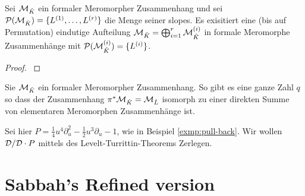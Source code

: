 \begin{thm}
\cite[Thm 5.3.1]{sabbah_cimpa90}
Sei $\mathcal{M}_{\hat{K}}$ ein formaler Meromorpher Zusammenhang und sei
$\mathcal{P}(\mathcal{M}_{\hat K})=\{L^{(1)},\dots,L^{(r)}\}$ die Menge seiner slopes. Es
exisitiert eine (bis auf Permutation) eindutige Aufteilung $\mathcal{M}_{\hat
K}=\bigoplus_{i=1}^r\mathcal{M}_{\hat K}^{(i)}$ in formale Meromorphe Zusammenhänge
mit $\mathcal{P}(\mathcal{M}_{\hat K}^{(i)})=\{L^{(i)}\}$.
\end{thm}
\begin{proof}
\cite[Thm 5.3.1]{sabbah_cimpa90}
\end{proof}
\begin{comment}
Aussagen, die aus dem Beweis entstehen:\\
Wir erhalten die Exacte Sequenz
\[
0 \rightarrow \cD_{\hat K}/\cD_{\hat K} \cdot P_1
  \rightarrow \cD_{\hat K}/\cD_{\hat K} \cdot P
  \rightarrow \cD_{\hat K}/\cD_{\hat K} \cdot P_2
  \rightarrow 0
\]
\begin{cor}
\cite[Thm 5.3.4]{sabbah_cimpa90}
$\cP(P)=\cP(P_1)\cup\cP(P_2)$ und $\cP(P_1)\cap\cP(P_2)=\emptyset$
\end{cor}
\end{comment}
\begin{comment}
\cite[Page 34]{sabbah_cimpa90}
Sei $\cM_{\hat K}$ ein formaler Meromorpher Zusammenhang. Man definiert
$\pi^*\cM_{\hat K}$ als den Vektor Raum über $\hat L:\pi^*\cM_{\hat K}=\hat
L\otimes_{\hat K}\cM_{\hat K}$. Dann definiert man die Wirkung von
$\partial_t$ durch: $t\partial_t\cdot(1\otimes
m)=q(1\otimes(x\partial_x\otimes m))$ und damit
\[
t\partial_t\cdot(\phi\otimes m)=q(\phi\otimes(x\partial_x\cdot
m))+((t\frac{\partial\phi}{\partial t})\otimes m) \,.
\]
\end{comment}
\begin{thm}
\cite[Thm 5.4.7]{sabbah_cimpa90}
Sie $\mathcal{M}_{\hat K}$ ein formaler Meromorpher Zusammenhang. So gibt es eine
ganze Zahl $q$ so dass der Zusammenhang $\pi^*\mathcal{M}_{\hat K}=\mathcal{M}_{\hat L}$
isomorph zu einer direkten Summe von elementaren Meromorphen Zusammenhänge
ist.
\end{thm}

\begin{exmp}
Sei hier $P=\frac{1}{4}u^4\partial_u^2-\frac{1}{2}u^3\partial_u-1$, wie in
Beispiel \ref{exmp:pull-back}.
Wir wollen $\mathcal{D}/\mathcal{D}\cdot P$ mittels des Levelt-Turrittin-Theorems Zerlegen.
\end{exmp}

\section{Sabbah's Refined version}

